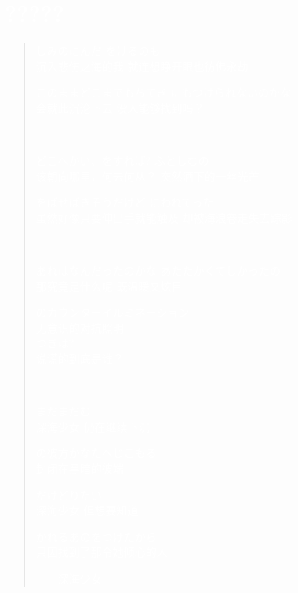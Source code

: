 \documentclass{article}
\theoremstyle{nonumberplain}
\begin{document}
\section*{\textcolor{white}{?????}}
\begin{quote}
	\textcolor{white}{しみのにんだ をけるのも\\
		沉入悲伤之海的我 就连想睁开眼也彷佛永劫}

	\textcolor{white}{このままどこまでもちてき にもつけられないのかな\\
		会就此沉沦下去 没人能够找到吗？}

	\ \par

	\textcolor{white}{どこへかい、をすれば? ふとしむの\\
		该朝向哪里，何去何从？ 突然洒下的一丝光芒}

	\textcolor{white}{をばせばきそうだけど にわれてった\\
		虽然好像只要伸出手就能触及 却被海浪卷走失去踪影}

	\ \par

	\textcolor{white}{あれはなんだったのかな あたたかくてしかったの\\
		那究竟是什么呢 既温暖又炫目}

	\textcolor{white}{のカウンターイルミネーション\\
		无意识的对抗照明\\
		つきは?\\
		说谎的到底是谁？}

	\ \par

	\textcolor{white}{ まだまだむ\\
		深海少女 仍在继续下沉}

	\textcolor{white}{の{彼方}{かなた}へじこもる\\
	封闭在黑暗的彼端}

	\textcolor{white}{ だけどりたい\\
		深海少女 但想要知道}

	\textcolor{white}{かれるあのをつけたから\\
		只因找到了那令她倾心的人}
	\begin{flushright}\textcolor{white}{------深海少女}\end{flushright}
\end{quote}
\newpage
\end{document}
